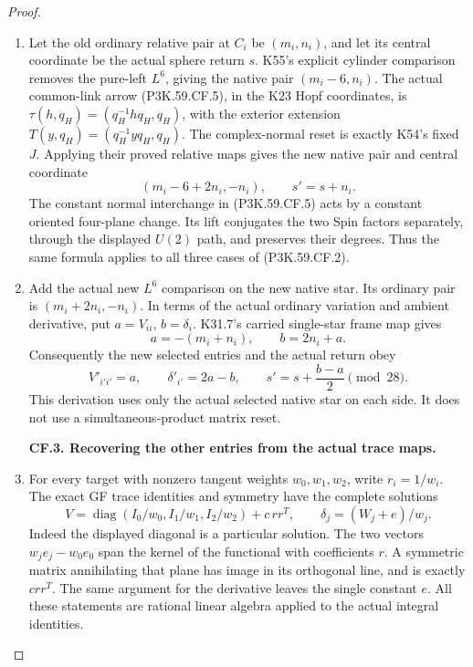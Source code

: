 \begin{proof}
\begin{enumerate}[label=\arabic*.]
\par\medskip\noindent\textbf{CF.2. Exact selected-coordinate update.}\par\nopagebreak[4]

\item Let the old ordinary relative pair at \(C_i\) be \((m_i,n_i)\),
and let its central coordinate be the actual sphere return \(s\).
K55's explicit cylinder comparison removes the pure-left
\(L^6\), giving the native pair \((m_i-6,n_i)\).
The actual common-link arrow (P3K.59.CF.5), in the K23 Hopf coordinates,
is \(\tau(h,q_H)=(q_H^{-1}hq_H,q_H)\), with the exterior
extension \(T(y,q_H)=(q_H^{-1}yq_H,q_H)\). The complex-normal
reset is exactly K54's fixed \(J\). Applying their proved
relative maps gives the new native pair and central coordinate
\[
 (m_i-6+2n_i,-n_i),\qquad s'=s+n_i.                   \tag{P3K.59.CF.9}
\]
The constant normal interchange in (P3K.59.CF.5) acts by a constant
oriented four-plane change. Its lift conjugates the two Spin
factors separately, through the displayed \(U(2)\) path, and
preserves their degrees. Thus the same formula applies to
all three cases of (P3K.59.CF.2).

\item Add the actual new \(L^6\) comparison on the new native star.
Its ordinary pair is \((m_i+2n_i,-n_i)\). In terms of the
actual ordinary variation and ambient derivative, put
\(a=V_{ii}\), \(b=\delta_i\). K31.7's carried single-star
frame map gives
\[
 a=-(m_i+n_i),\qquad b=2n_i+a.
\]
Consequently the new selected entries and the actual return obey
\[
 V'_{i'i'}=a,\qquad \delta'_{i'}=2a-b,\qquad
 s'=s+\frac{b-a}{2}\pmod {28}.                       \tag{P3K.59.CF.10}
\]
This derivation uses only the actual selected native star on
each side. It does not use a simultaneous-product matrix reset.

\par\medskip\noindent\textbf{CF.3. Recovering the other entries from the actual trace maps.}\par\nopagebreak[4]

\item For every target with nonzero tangent weights \(w_0,w_1,w_2\),
write \(r_i=1/w_i\). The exact GF trace identities and symmetry
have the complete solutions
\[
 V=\operatorname{diag}(I_0/w_0,I_1/w_1,I_2/w_2)+c\,rr^T,
 \qquad \delta_j=(W_j+e)/w_j.                         \tag{P3K.59.CF.11}
\]
Indeed the displayed diagonal is a particular solution. The
two vectors \(w_je_j-w_0e_0\) span the kernel of the functional
with coefficients \(r\). A symmetric matrix annihilating that
plane has image in its orthogonal line, and is exactly
\(c rr^T\). The same argument for the derivative leaves
the single constant \(e\). All these statements are rational
linear algebra applied to the actual integral identities.


\end{enumerate}
\end{proof}
